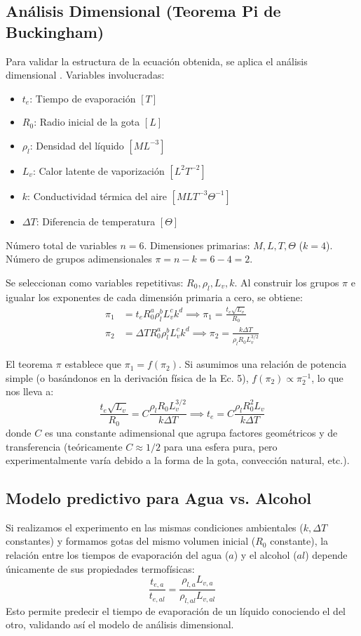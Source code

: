 \documentclass[12pt, letterpaper, onecolumn]{article}
\begin{document}
\subsection{Análisis Dimensional (Teorema Pi de Buckingham)}
Para validar la estructura de la ecuación obtenida, se aplica el análisis dimensional \citep{szirtes2007}.
Variables involucradas:
\begin{itemize}
  \item $t_e$: Tiempo de evaporación $[T]$
  \item $R_0$: Radio inicial de la gota $[L]$
  \item $\rho_l$: Densidad del líquido $[M L^{-3}]$
  \item $L_v$: Calor latente de vaporización $[L^2 T^{-2}]$
  \item $k$: Conductividad térmica del aire $[M L T^{-3} \Theta^{-1}]$
  \item $\Delta T$: Diferencia de temperatura $[\Theta]$
\end{itemize}

Número total de variables $n = 6$. Dimensiones primarias: $M, L, T, \Theta$ ($k = 4$).
Número de grupos adimensionales $\pi = n - k = 6 - 4 = 2$.

Se seleccionan como variables repetitivas: $R_0, \rho_l, L_v, k$. Al construir los grupos $\pi$ e igualar los exponentes de cada dimensión primaria a cero, se obtiene:
\begin{align}
\pi_1 &= t_e R_0^a \rho_l^b L_v^c k^d \implies \pi_1 = \frac{t_e \sqrt{L_v}}{R_0} \\
\pi_2 &= \Delta T R_0^a \rho_l^b L_v^c k^d \implies \pi_2 = \frac{k \Delta T}{\rho_l R_0 L_v^{3/2}}
\end{align}

El teorema $\pi$ establece que $\pi_1 = f(\pi_2)$. Si asumimos una relación de potencia simple (o basándonos en la derivación física de la Ec. 5), $f(\pi_2) \propto \pi_2^{-1}$, lo que nos lleva a:
\begin{equation}
\frac{t_e \sqrt{L_v}}{R_0} = C \frac{\rho_l R_0 L_v^{3/2}}{k \Delta T} \implies t_e = C \frac{\rho_l R_0^2 L_v}{k \Delta T}
\end{equation}
donde $C$ es una constante adimensional que agrupa factores geométricos y de transferencia (teóricamente $C \approx 1/2$ para una esfera pura, pero experimentalmente varía debido a la forma de la gota, convección natural, etc.).

\subsection{Modelo predictivo para Agua vs. Alcohol}
Si realizamos el experimento en las mismas condiciones ambientales ($k, \Delta T$ constantes) y formamos gotas del mismo volumen inicial ($R_0$ constante), la relación entre los tiempos de evaporación del agua ($a$) y el alcohol ($al$) depende únicamente de sus propiedades termofísicas:
\begin{equation}
\frac{t_{e,a}}{t_{e,al}} = \frac{\rho_{l,a} L_{v,a}}{\rho_{l,al} L_{v,al}}
\end{equation}
Esto permite predecir el tiempo de evaporación de un líquido conociendo el del otro, validando así el modelo de análisis dimensional.
\end{document}
